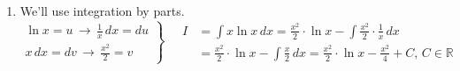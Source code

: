 \documentclass[a4paper, 12pt]{article}
\begin{document}
\begin{enumerate}[leftmargin=*,label=\textbf{\arabic*.}]
\item We'll use integration by parts.
\[
\left.
\begin{array}{ll}
\displaystyle\ln x=u\,\rightarrow\,\frac1x\,dx=du  \\
\displaystyle x\,dx= dv \,\rightarrow\,\frac{x^2}2=v
\end{array}
\right\}\quad
\begin{array}{ll}
I&=\displaystyle\int x\ln x\,dx = \frac{x^2}2\cdot\ln x-\int\frac{x^2}2\cdot \frac1x \,dx \\[1em]&=\displaystyle\frac{x^2}2\cdot\ln x-\int\frac{x}2\,dx=\boxed{\frac{x^2}2\cdot\ln x - \frac{x^2}4+C,\,C\in\mathbb{R}}
\end{array}
\]
\end{enumerate}
\end{document}
